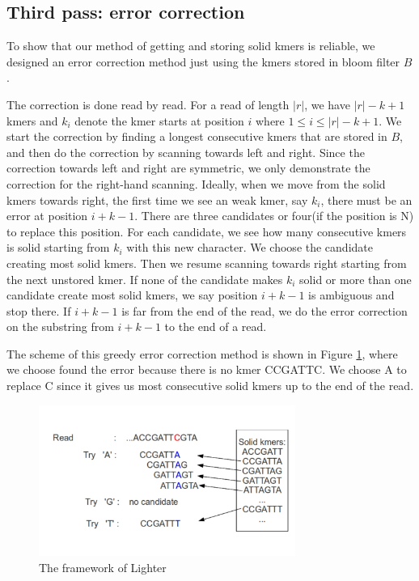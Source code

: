 \documentclass[10pt]{article}
\begin{document}
\subsection*{Third pass: error correction}
To show that our method of getting and storing solid kmers is reliable, we designed an error correction method just using the kmers stored in bloom filter $B$.

The correction is done read by read. For a read of length $|r|$, we have $|r|-k+1$ kmers and $k_i$ denote the kmer starts at position $i$ where $1\le i\le|r|-k+1$. We start the correction by finding a longest consecutive kmers that are stored in $B$, and then do the correction by scanning towards left and right. Since the correction towards left and right are symmetric, we only demonstrate the correction for the right-hand scanning. Ideally, when we move from the solid kmers towards right, the first time we see an weak kmer, say $k_i$, there must be an error at position $i+k-1$. There are three candidates or four(if the position is N) to replace this position. For each candidate, we see how many consecutive kmers is solid starting from $k_i$ with this new character. We choose the candidate creating most solid kmers. Then we resume scanning towards right starting from the next unstored kmer. If none of the candidate makes $k_i$ solid or more than one candidate create most solid kmers, we say position $i+k-1$ is ambiguous and stop there. If $i+k-1$ is far from the end of the read, we do the error correction on the substring from $i+k-1$ to the end of a read.

The scheme of this greedy error correction method is shown in Figure \ref{fig:error_correction}, where we choose found the error because there is no kmer CCGATTC. We choose A to replace C since it gives us most consecutive solid kmers up to the end of the read.

\begin{figure}[h!]
\begin{center}
\includegraphics[width=0.75\textwidth]{ErrorCorrection.jpg}
\caption{The framework of Lighter\label{fig:error_correction}}
\end{center}
\end{figure}
\end{document}
